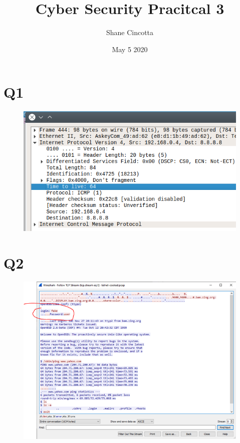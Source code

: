 \documentclass{article}
\title{Cyber Security Pracitcal 3}
\author{Shane Cincotta }
\date{May 5 2020}
\begin{document}
\maketitle


\section*{Q1}
\begin{figure}[h!]
\centering
\includegraphics[scale=0.5]{Q1.png}
\caption{}
\end{figure}

\section*{Q2}
\begin{figure}[h!]
\centering
\includegraphics[scale=0.5]{Q2.png}
\caption{}
\end{figure}
\clearpage
\end{document}
